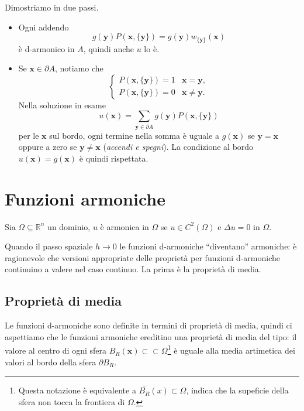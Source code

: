 \documentclass[10pt,a4paper,twoside,openright]{book}
\newcommand{\x}{\mathbf{x}}
\newcommand{\y}{\mathbf{y}}
\begin{document}
\begin{dimostrazione} Dimostriamo in due passi.
	\begin{itemize}
		\item Ogni addendo
		\begin{equation*}
			g(\y) P(\x,\{\y\}) =g(\y) w_{\{\y\}}(\x)
		\end{equation*}
		è d-armonico in $A$, quindi anche $u$ lo è.

		\item Se $\x\in \partial A$, notiamo che
		\begin{equation*}
			\begin{cases}
				P(\x,\{\y\}) =1 & \x=\y,     \\
				P(\x,\{\y\}) =0 & \x\neq \y.
			\end{cases}
		\end{equation*}
		Nella soluzione in esame
		\begin{equation*}
			u(\x) =\sum _{\y\in \partial A} g(\y) P(\x,\{\y\})
		\end{equation*}
		per le $\x$ sul bordo, ogni termine nella somma è uguale a $g(\x)$ se $\y=\x$ oppure a zero se $\y\neq \x$ (\textit{accendi e spegni}).
		La condizione al bordo $u(\x) =g(\x)$ è quindi rispettata.
	\end{itemize}
\end{dimostrazione}
\section{Funzioni armoniche}

Sia $\Omega \subseteq \mathbb{R}^{n}$ un dominio, $u$ è armonica in $\Omega $ se $u\in C^{2}(\Omega)$ e $\Delta u=0$ in $\Omega $. 

Quando il passo spaziale $h\rightarrow 0$ le funzioni d-armoniche ``diventano'' armoniche: è ragionevole che versioni appropriate delle proprietà per funzioni d-armoniche continuino a valere nel caso continuo. La prima è la proprietà di media.
\subsection{Proprietà di media}

Le funzioni d-armoniche sono definite in termini di proprietà di media, quindi ci aspettiamo che le funzioni armoniche ereditino una proprietà di media del tipo: il valore al centro di ogni sfera $B_{R}(\x) \subset \subset \Omega $\footnote{Questa notazione è equivalente a $\overline{B_{R}}(x) \subset \Omega $, indica che la supeficie della sfera non tocca la frontiera di $\Omega $.} è uguale alla media artimetica dei valori al bordo della sfera $\partial B_{R}$.
\end{document}

